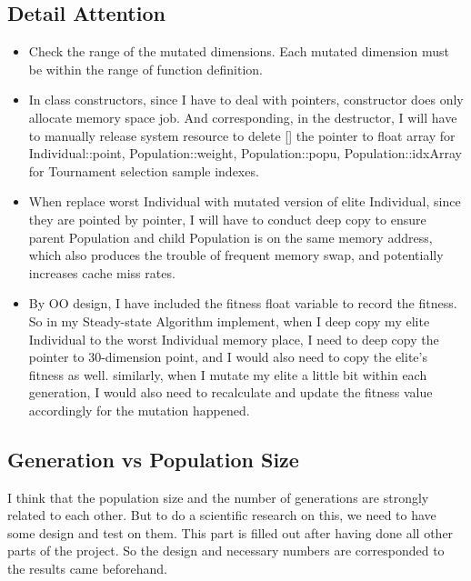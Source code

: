 \documentclass[b5paper,11pt, abstraction, titlepage]{scrartcl}
\begin{document}
\begin{CJK}{UTF8}{gbsn}
\subsection{Detail Attention}
\begin{itemize}
  \itemsep=-3pt
\item Check the range of the mutated dimensions. Each mutated dimension must be within the range of function definition.
\item In class constructors, since I have to deal with pointers, constructor does only allocate memory space job. And corresponding, in the destructor, I will have to manually release system resource to delete [] the pointer to float array for Individual::point, Population::weight, Population::popu, Population::idxArray for Tournament selection sample indexes. 
\item When replace worst Individual with mutated version of elite Individual, since they are pointed by pointer, I will have to conduct deep copy to ensure parent Population and child Population is on the same memory address, which also produces the trouble of frequent memory swap, and potentially increases cache miss rates.  
\item By OO design, I have included the fitness float variable to record the fitness. So in my Steady-state Algorithm implement, when I deep copy my elite Individual to the worst Individual memory place, I need to deep copy the pointer to 30-dimension point, and I would also need to copy the elite's fitness as well. similarly, when I mutate my elite a little bit within each generation, I would also need to recalculate and update the fitness value accordingly for the mutation happened. 
\end{itemize}


\subsection{Generation vs Population Size}
I think that the population size and the number of generations are strongly related to each other. But to do a scientific research on this, we need to have some design and test on them. This part is filled out after having done all other parts of the project. So the design and necessary numbers are corresponded to the results came beforehand.


\end{CJK}
\end{document}
